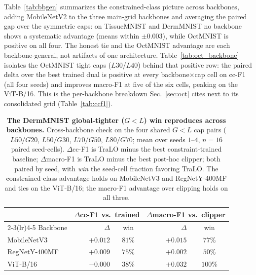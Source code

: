 \documentclass[10pt]{article}
\begin{document}
Table~\ref{tab:bbgen} summarizes the constrained-class picture across
backbones, adding MobileNetV2 to the three main-grid backbones and
averaging the paired gap over the symmetric caps: on TissueMNIST and
DermMNIST no backbone shows a systematic advantage (means within
$\pm0.003$), while OctMNIST is positive on all four. The honest tie
and the OctMNIST advantage are each backbone-general, not artifacts of
one architecture. Table~\ref{tab:oct_backbone} isolates the OctMNIST
tight caps ($L30$/$L40$) behind that positive row: the paired delta
over the best trained dual is positive at every backbone$\times$cap
cell on cc-F1 (all four seeds) and improves macro-F1 at five of the
six cells, peaking on the ViT-B/16. This is the per-backbone breakdown
Sec.~\ref{sec:oct} cites next to its consolidated grid
(Table~\ref{tab:ccf1}).







\begin{table}[t]\centering\small
\setlength{\tabcolsep}{5pt}
\caption{\textbf{The DermMNIST global-tighter ($G{<}L$) win reproduces
across backbones.} Cross-backbone check on the four shared $G{<}L$
cap pairs ($L50/G20$, $L50/G30$, $L70/G50$, $L80/G70$; mean over
seeds $1$--$4$, $n{=}16$ paired seed-cells). $\Delta$cc-F1 is TraLO
minus the best constraint-trained baseline; $\Delta$macro-F1 is TraLO
minus the best post-hoc clipper; both paired by seed, with \emph{win}
the seed-cell fraction favoring TraLO. The constrained-class advantage
holds on MobileNetV3 and RegNet{Y-400MF} and ties on the ViT{-B/16}; the macro-F1
advantage over clipping holds on all three.}
\label{tab:asym_xbackbone}
\setlength{\tabcolsep}{4pt}\small
\begin{tabular}{l rc rc}
\toprule
 & \multicolumn{2}{c}{$\Delta$cc-F1 vs.\ trained} & \multicolumn{2}{c}{$\Delta$macro-F1 vs.\ clipper} \\
\cmidrule(lr){2-3}\cmidrule(lr){4-5}
Backbone & $\Delta$ & win & $\Delta$ & win \\
\midrule
MobileNetV3    & $+0.012$ & $81\%$  & $+0.015$ & $77\%$ \\
RegNetY-400MF  & $+0.009$ & $75\%$  & $+0.002$ & $50\%$ \\
ViT-B/16       & $-0.000$ & $38\%$  & $+0.032$ & $100\%$ \\
\bottomrule
\end{tabular}
\end{table}
\end{document}
